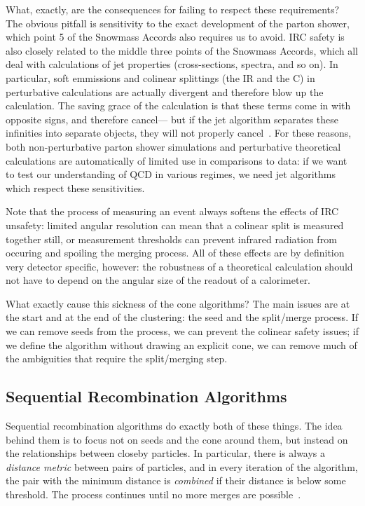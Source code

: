 What, exactly, are the consequences for failing to respect these requirements? The obvious pitfall is sensitivity to the exact development of the parton shower, which point 5 of the Snowmass Accords also requires us to avoid. IRC safety is also closely related to the middle three points of the Snowmass Accords, which all deal with calculations of jet properties (cross-sections, \pt spectra, and so on). In particular, soft emmissions and colinear splittings (the IR and the C) in perturbative calculations are actually divergent and therefore blow up the calculation. The saving grace of the calculation is that these terms come in with opposite signs, and therefore cancel--- but if the jet algorithm separates these infinities into separate objects, they will not properly cancel~\cite{Jetography}. For these reasons, both non-perturbative parton shower simulations and perturbative theoretical calculations are automatically of limited use in comparisons to data: if we want to test our understanding of QCD in various regimes, we need jet algorithms which respect these sensitivities.

Note that the process of measuring an event always softens the effects of IRC unsafety: limited angular resolution can mean that a colinear split is measured together still, or measurement thresholds can prevent infrared radiation from occuring and spoiling the merging process. All of these effects are by definition very detector specific, however: the robustness of a theoretical calculation should not have to depend on the angular size of the readout of a calorimeter.

What exactly cause this sickness of the cone algorithms? The main issues are at the start and at the end of the clustering: the seed and the split/merge process. If we can remove seeds from the process, we can prevent the colinear safety issues; if we define the algorithm without drawing an explicit cone, we can remove much of the ambiguities that require the split/merging step.

\subsection{Sequential Recombination Algorithms}

Sequential recombination algorithms do exactly both of these things. The idea behind them is to focus not on seeds and the cone around them, but instead on the relationships between closeby particles. In particular, there is always a \textit{distance metric} between pairs of particles, and in every iteration of the algorithm, the pair with the minimum distance is \textit{combined} if their distance is below some threshold. The process continues until no more merges are possible~\cite{Jetography}.

